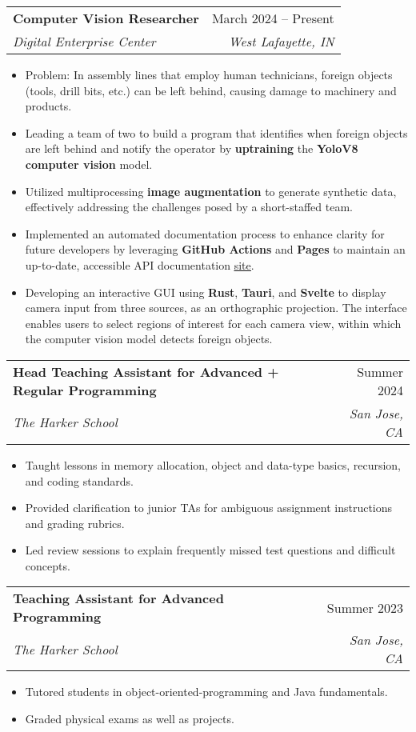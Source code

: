 \documentclass[letterpaper,11pt]{article}
\makeatletter
\newcommand{\resumeItem}[1]{
  \item\small{
    {#1 \vspace{-2pt}}
  }
}
\newcommand{\resumeSubheading}[4]{
  \vspace{-2pt}\item
    \begin{tabular*}{0.97\textwidth}[t]{l@{\extracolsep{\fill}}r}
      \textbf{#1} & #2 \\
      \textit{\small#3} & \textit{\small #4} \\
    \end{tabular*}\vspace{-7pt}
}
\newcommand{\resumeItemListStart}{\begin{itemize}}
\newcommand{\resumeItemListEnd}{\end{itemize}\vspace{-5pt}}
\makeatother
\begin{document}
    \resumeSubheading
      {Computer Vision Researcher}{March 2024 – Present}
      {Digital Enterprise Center}{West Lafayette, IN}
      \resumeItemListStart
        \resumeItem{Problem: In assembly lines that employ human technicians, foreign objects (tools, drill bits, etc.) can be left behind, causing damage to machinery and products.}
        \resumeItem{Leading a team of two to build a program that identifies when foreign objects are left behind and notify the operator by \textbf{uptraining} the \textbf{YoloV8 computer vision} model.
        }
        \resumeItem{Utilized multiprocessing \textbf{image augmentation} to generate synthetic data, effectively addressing the challenges posed by a short-staffed team.
        }
        \resumeItem{Implemented an automated documentation process to enhance clarity for future developers by leveraging \textbf{GitHub Actions} and \textbf{Pages} to maintain an up-to-date, accessible API documentation \href{https://jlz22.github.io/Computer-Vision-for-FOD/index.html}{\underline{site}}.}
        \resumeItem{Developing an interactive GUI using \textbf{Rust}, \textbf{Tauri}, and \textbf{Svelte} to display camera input from three sources, as an orthographic projection. The interface enables users to select regions of interest for each camera view, within which the computer vision model detects foreign objects.
        }
        \resumeItemListEnd
      
    \resumeSubheading
      {Head Teaching Assistant for Advanced + Regular Programming}{Summer 2024}
      {The Harker School}{San Jose, CA}
      \resumeItemListStart
        \resumeItem{Taught lessons in memory allocation, object and data-type basics, recursion, and coding standards.
        }
        \resumeItem{Provided clarification to junior TAs for ambiguous assignment instructions and grading rubrics.
        }
        \resumeItem{Led review sessions to explain frequently missed test questions and difficult concepts.
        }
      \resumeItemListEnd

    \resumeSubheading
    {Teaching Assistant for Advanced Programming}{Summer 2023}
    {The Harker School}{San Jose, CA}
      \resumeItemListStart
        \resumeItem{Tutored students in object-oriented-programming and Java fundamentals.}
        \resumeItem{Graded physical exams as well as projects.}
        \resumeItemListEnd
      
\end{document}
